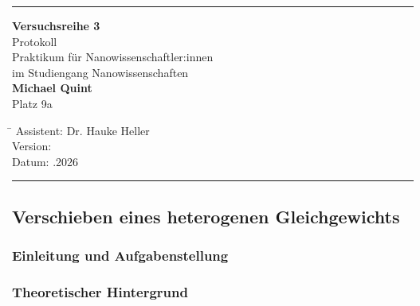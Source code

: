 \documentclass[
	a4paper,										%
	12pt,											%
	twoside,										%
	headsepline,								%
	footsepline,									%
	captions=tableheading,					%
]{scrartcl}
\begin{document}
	
	\begin{titlepage}
		\begin{center}
			\hrule													%
			\vspace*{5cm}
			\Huge {\textbf {Versuchsreihe 3}}\\						%
			\vspace*{0.5cm}
			\vspace*{1cm}
			\normalsize
			Protokoll	\\									
			Praktikum für Nanowissenschaftler:innen\\
			im Studiengang Nanowissenschaften\\
			\vspace*{0.5cm}
			\Large {\textbf{Michael Quint}}		\\						%
			\vspace*{0.5cm}
					\normalsize{Platz 9a}								%
			\vfill
		\end{center}
		\begin{tabbing}
			\hspace{3cm}\=\kill
			Assistent: \> Dr. Hauke Heller \\						%
			Version:  \\									%
			Datum: .2026 \\								%
		\end{tabbing}
		\hrule														%
\end{titlepage}

\setcounter{page}{1}
\setcounter{section}{3}								%
\setcounter{subsection}{0}							%
\setcounter{secnumdepth}{4}
	
\subsection{Verschieben eines heterogenen Gleichgewichts}

\subsubsection{Einleitung und Aufgabenstellung}

\subsubsection{Theoretischer Hintergrund}
\end{document}
